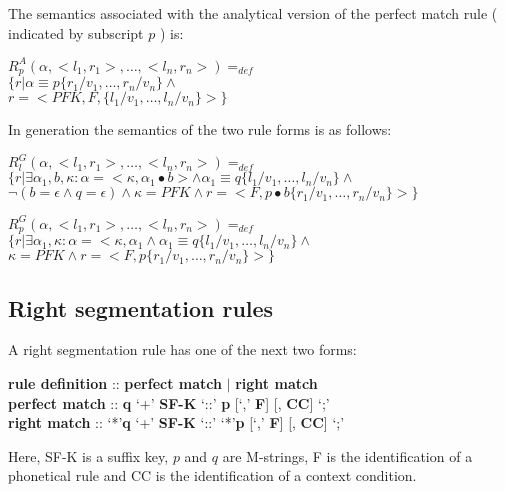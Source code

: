 The semantics associated with the analytical version of the
 perfect match rule ( indicated by subscript $p$ ) is:
\small
\begin{code}
$R^{A}_{p}(\alpha,<l_{1},r_{1}>, \ldots ,<l_{n},r_{n}>) =_{def}$\\
\>$\{ r | \alpha \equiv p\{r_{1}/v_{1},\ldots,r_{n}/v_{n}\} \wedge$\\
\>$r = <PFK, F, \{l_{1}/v_{1},\ldots,l_{n}/v_{n}\}> \}$\\
\end{code}
\normalsize
In generation the semantics of the two rule forms is as follows:
\small
\begin{code}
$R^{G}_{l}(\alpha,<l_{1},r_{1}>, \ldots ,<l_{n},r_{n}>) =_{def}$\\
\>$\{ r | \exists \alpha_{1}, b, \kappa : \alpha = <\kappa ,\alpha
_{1}\bullet b> \wedge \alpha_{1} \equiv q\{l_{1}/v_{1},\ldots,l_{n}/v_{n}\} \wedge$\\
\>$\neg( b = \epsilon \wedge q = \epsilon ) \wedge \kappa = PFK \wedge r = <F, p\bullet b\{r_{1}/v_{1},\ldots,r_{n}/v_{n}\}> \}$\\
\end{code}
\normalsize
\small
\begin{code}
$R^{G}_{p}(\alpha,<l_{1},r_{1}>, \ldots ,<l_{n},r_{n}>) =_{def}$\\
\>$\{ r | \exists \alpha_{1}, \kappa : \alpha = <\kappa ,\alpha_{1} \wedge \alpha_{1} \equiv q\{l_{1}/v_{1},\ldots,l_{n}/v_{n}\} \wedge$\\
\>$\kappa = PFK \wedge r = <F, p\{r_{1}/v_{1},\ldots,r_{n}/v_{n}\}> \}$\\
\end{code}
\normalsize
\subsection{Right segmentation rules}
A right segmentation rule has one of the next two forms:
\small
\begin{code}
{\bf rule definition } :: {\bf perfect match} $|$ {\bf right match} \\
{\bf perfect match } :: {\bf q} `+' {\bf SF-K} `::' {\bf p} [`,' {\bf F}] [, {\bf CC}] `;'\\
{\bf right match } :: `*'{\bf q} `+' {\bf SF-K} `::' `*'{\bf p} [`,' {\bf F}] [, {\bf CC}] `;' \\
\end{code}
\normalsize
Here, SF-K is a suffix key, $p$ and $q$ are M-strings, F is the
identification of a phonetical rule and CC is the identification of a
context condition.


